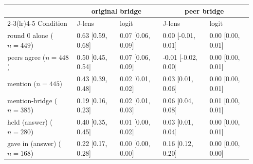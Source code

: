 \begin{tabular}{lllll}
\toprule
 & \multicolumn{2}{c}{original bridge} & \multicolumn{2}{c}{peer bridge} \\
\cmidrule(lr){2-3}\cmidrule(lr){4-5}
Condition & J-lens & logit & J-lens & logit \\
\midrule
round 0 alone ($n{=}449$) & 0.63 [0.59, 0.68] & 0.07 [0.06, 0.09] & 0.00 [-0.01, 0.01] & 0.00 [0.00, 0.01] \\
peers agree ($n{=}448$) & 0.50 [0.45, 0.54] & 0.07 [0.06, 0.09] & -0.01 [-0.02, 0.00] & 0.00 [0.00, 0.01] \\
mention ($n{=}445$) & 0.43 [0.39, 0.48] & 0.02 [0.01, 0.02] & 0.03 [0.01, 0.06] & 0.00 [0.00, 0.01] \\
mention-bridge ($n{=}385$) & 0.19 [0.16, 0.23] & 0.02 [0.01, 0.03] & 0.06 [0.04, 0.08] & 0.01 [0.00, 0.01] \\
held (answer) ($n{=}280$) & 0.40 [0.35, 0.45] & 0.01 [0.00, 0.02] & 0.03 [0.01, 0.04] & 0.00 [0.00, 0.01] \\
gave in (answer) ($n{=}168$) & 0.22 [0.17, 0.28] & 0.00 [0.00, 0.00] & 0.16 [0.12, 0.20] & 0.00 [0.00, 0.00] \\
\bottomrule
\end{tabular}

